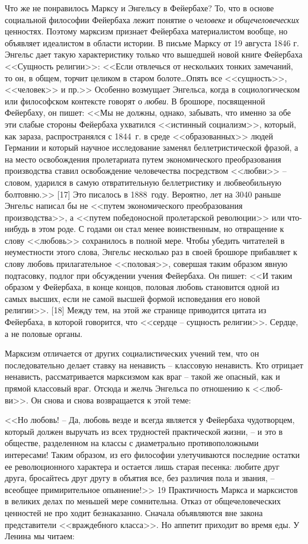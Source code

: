 \documentclass{book}
\begin{document}
Что же не понравилось Марксу и Энгельсу в Фейербахе? То, что в основе социальной философии Фейербаха лежит понятие о 
\textit{человеке}  и \textit{общечеловеческих} ценностях. Поэтому марксизм признает Фейербаха материалистом вообще, но объявляет 
иде­алистом в области истории. В письме Марксу от 19 августа 1846 г. Энгельс дает такую характеристику только что вышед­шей новой 
книге Фейербаха <<Сущность религии>>: <<Если от­влечься от нескольких тонких замечаний, то он, в общем, торчит целиком в старом 
болоте\ldots Опять все <<сущность>>, <<человек>> и пр.>> Особенно возмущает Энгельса, когда в социологическом или философском 
контексте говорят о \textit{любви}.  В брошюре, по­священной Фейербаху, он пишет: <<Мы не должны, однако, забы­вать, что именно за 
обе эти слабые стороны Фейербаха ухватился <<истинный социализм>>, который, как зараза, распространялся с 1844~г. в среде 
<<образованных>> людей Германии и который научное исследование заменял беллетристической фразой, а на место освобождения 
пролетариата путем экономического пре­образования производства ставил освобождение человечества посредством <<любви>> -- словом, 
ударился в самую отвратитель­ную беллетристику и любвеобильную болтовню.>> [17] Это писа­лось в 1888~году. Вероятно, лет на 3040 
раньше Энгельс написал бы не <<путем экономического преобразования производства>>, а <<путем победоносной пролетарской революции>> 
или что-нибудь в этом роде. С годами он стал менее воинственным, но отвращение к слову <<любовь>> сохранилось в полной мере. Чтобы 
убедить читателей в неуместности этого слова, Энгельс несколько раз в своей брошюре прибавляет к слову любовь прилагательное 
<<половая>>, совершая таким образом явную подтасовку, подлог при обсуждении учения Фейербаха. Он пи­шет: <<И таким образом у 
Фейербаха, в конце концов, половая любовь становится одной из самых высших, если не самой выс­шей формой исповедания его новой 
религии>>. [18] Между тем, на этой же странице приводится цитата из Фейербаха, в кото­рой говорится, что <<сердце -- сущность 
религии>>. Сердце, а не половые органы.

Марксизм отличается от других социалистических учений тем, что он последовательно делает ставку на ненависть -- клас­совую 
ненависть. Кто отрицает ненависть, рассматривается марксизмом как враг -- такой же опасный, как и прямой классовый враг. Отсюда 
и желчь Энгельса по отношению к <<люб­ви>>. Он снова и снова возвращается к этой теме:

<<Но любовь! -- Да, любовь везде и всегда является у Фейер­баха чудотворцем, который должен выручать из всех трудно­стей 
практической жизни, -- и это в обществе, разделенном на классы с диаметрально противоположными интересами! Та­ким образом, из его 
философии улетучиваются последние остат­ки ее революционного характера и остается лишь старая песен­ка: любите друг друга, 
бросайтесь друг другу в объятия все, без различия пола и звания, -- всеобщее примирительное опьянение!>> 19
Практичность Маркса и марксистов в великих делах по меньшей мере сомнительна. Отказ от общечеловеческих ценно­стей не про ходит 
безнаказанно. Сначала объявляются вне закона представители <<враждебного класса>>. Но аппетит приходит во время еды. У Ленина мы 
читаем:
\end{document}
